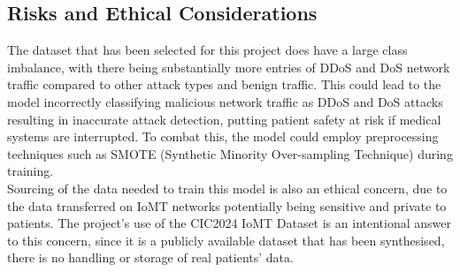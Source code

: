\documentclass[11pt,a4paper]{article}
\begin{document}
\subsection{Risks and Ethical Considerations}
The dataset that has been selected for this project does have a large class imbalance, with there being substantially more entries of DDoS and DoS network traffic compared to other attack types and benign traffic. This could lead to the model incorrectly classifying malicious network traffic as DDoS and DoS attacks resulting in inaccurate attack detection, putting patient safety at risk if medical systems are interrupted. To combat this, the model could employ preprocessing techniques such as SMOTE (Synthetic Minority Over-sampling Technique) during training.
\\
Sourcing of the data needed to train this model is also an ethical concern, due to the data transferred on IoMT networks potentially being sensitive and private to patients. The project’s use of the CIC2024 IoMT Dataset is an intentional answer to this concern, since it is a publicly available dataset that has been synthesised, there is no handling or storage of real patients’ data. 
\newpage


\end{document}

